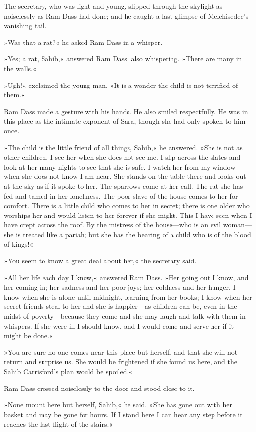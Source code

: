 The secretary, who was light and young, slipped through the skylight as noiselessly as Ram Dass had done; and he caught a last glimpse of Melchisedec's vanishing tail.

»Was that a rat?« he asked Ram Dass in a whisper.

»Yes; a rat, Sahib,« answered Ram Dass, also whispering. »There are many in the walls.«

»Ugh!« exclaimed the young man. »It is a wonder the child is not terrified of them.«

Ram Dass made a gesture with his hands. He also smiled respectfully. He was in this place as the intimate exponent of Sara, though she had only spoken to him once.

»The child is the little friend of all things, Sahib,« he answered. »She is not as other children. I see her when she does not see me. I slip across the slates and look at her many nights to see that she is safe. I watch her from my window when she does not know I am near. She stands on the table there and looks out at the sky as if it spoke to her. The sparrows come at her call. The rat she has fed and tamed in her loneliness. The poor slave of the house comes to her for comfort. There is a little child who comes to her in secret; there is one older who worships her and would listen to her forever if she might. This I have seen when I have crept across the roof. By the mistress of the house—who is an evil woman—she is treated like a pariah; but she has the bearing of a child who is of the blood of kings!«

»You seem to know a great deal about her,« the secretary said.

»All her life each day I know,« answered Ram Dass. »Her going out I know, and her coming in; her sadness and her poor joys; her coldness and her hunger. I know when she is alone until midnight, learning from her books; I know when her secret friends steal to her and she is happier—as children can be, even in the midst of poverty—because they come and she may laugh and talk with them in whispers. If she were ill I should know, and I would come and serve her if it might be done.«

»You are sure no one comes near this place but herself, and that she will not return and surprise us. She would be frightened if she found us here, and the Sahib Carrisford's plan would be spoiled.«

Ram Dass crossed noiselessly to the door and stood close to it.

»None mount here but herself, Sahib,« he said. »She has gone out with her basket and may be gone for hours. If I stand here I can hear any step before it reaches the last flight of the stairs.«

